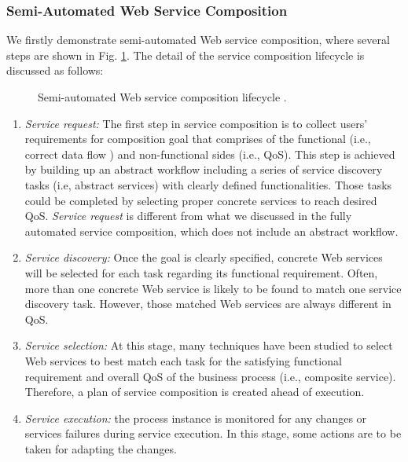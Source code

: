 \subsubsection{Semi-Automated Web Service Composition}\label{lifecycle}
We firstly demonstrate semi-automated Web service composition, where several steps are shown in Fig. \ref{fig:lifecycle}. The detail of the service composition lifecycle is discussed as follows:

\begin{figure}
\centerline{
}
\caption{Semi-automated Web service composition lifecycle \cite{moghaddam2014service}.}
\label{fig:lifecycle}
\end{figure}

\begin{enumerate}
 \item \textit{Service request:} The first step in service composition is to collect users' requirements for composition goal that comprises of the functional (i.e., correct data flow ) and non-functional sides (i.e., QoS). This step is achieved by building up an abstract workflow including a series of service discovery tasks (i.e, abstract services) with clearly defined functionalities. Those tasks could be completed by selecting proper concrete services to reach desired QoS. \textit{Service request} is different from what we discussed in the fully automated service composition, which does not include an abstract workflow.
 \item \textit{Service discovery:} Once the goal is clearly specified, concrete Web services will be selected for each task regarding its functional requirement. Often, more than one concrete Web service is likely to be found to match one service discovery task. However, those matched Web services are always different in QoS.
 \item \textit{Service selection:} At this stage, many techniques have been studied to select Web services to best match each task for the satisfying functional requirement and overall QoS of the business process (i.e., composite service). Therefore, a plan of service composition is created ahead of execution.
 \item \textit{Service execution:} the process instance is monitored for any changes or services failures during service execution. In this stage, some actions are to be taken for adapting the changes.
\end{enumerate}

